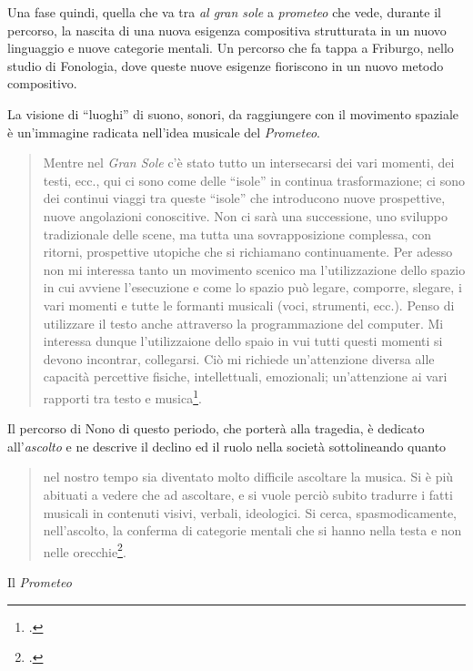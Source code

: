 Una fase quindi, quella che va tra \emph{al gran sole} a \emph{prometeo} che vede, durante il percorso, la nascita di una nuova esigenza compositiva strutturata in un nuovo linguaggio e nuove categorie mentali. Un percorso che fa tappa a Friburgo, nello studio di Fonologia, dove queste nuove esigenze fioriscono in un nuovo metodo compositivo.

La visione di “luoghi” di suono, sonori, da raggiungere con il movimento spaziale è un'immagine radicata nell'idea musicale del \emph{Prometeo}.

\begin{quote}
	Mentre nel \emph{Gran Sole} c'è stato tutto un intersecarsi dei vari momenti, dei testi, ecc., qui ci sono come delle “isole” in continua trasformazione; ci sono dei continui viaggi tra queste “isole” che introducono nuove prospettive, nuove angolazioni conoscitive. Non ci sarà una successione, uno sviluppo tradizionale delle scene, ma tutta una sovrapposizione complessa, con ritorni, prospettive utopiche che si richiamano continuamente. Per adesso non mi interessa tanto un movimento scenico ma l'utilizzazione dello spazio in cui avviene l'esecuzione e come lo spazio può legare, comporre, slegare, i vari momenti e tutte le formanti musicali (voci, strumenti, ecc.). Penso di utilizzare il testo anche attraverso la programmazione del computer. Mi interessa dunque l'utilizzaione dello spaio in vui tutti questi momenti si devono incontrar, collegarsi. Ciò mi richiede un'attenzione diversa alle capacità percettive fisiche, intellettuali, emozionali; un'attenzione ai vari rapporti tra testo e musica\footcite[vol. II p. 245, \emph{Intervista di Renato Garavaglia} 1979-80]{nono:scrcol}.
\end{quote}

Il percorso di Nono di questo periodo, che porterà alla tragedia, è dedicato all'\emph{ascolto} e ne descrive il declino ed il ruolo nella società sottolineando quanto

\begin{quote}
nel nostro tempo sia diventato molto difficile ascoltare la musica. Si è più abituati a vedere che ad ascoltare, e si vuole perciò subito tradurre i fatti musicali in contenuti visivi, verbali, ideologici. Si cerca, spasmodicamente, nell'ascolto, la conferma di categorie mentali che si hanno nella testa e non nelle orecchie\footcite[vol. II p. 259, \emph{Intervista di Dino Villatico} 1981]{nono:scrcol}.
\end{quote}

Il \emph{Prometeo}

